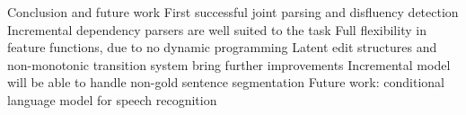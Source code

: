 \documentclass{lecture}
\begin{document}
\begin{points}{Conclusion and future work}
\p First successful joint parsing and disfluency detection
\p Incremental dependency parsers are well suited to the task
\p Full flexibility in feature functions, due to no dynamic programming
\p Latent edit structures and non-monotonic transition system bring further improvements
\p Incremental model will be able to handle non-gold sentence segmentation
\p Future work: conditional language model for speech recognition
\end{points}
\end{document}
